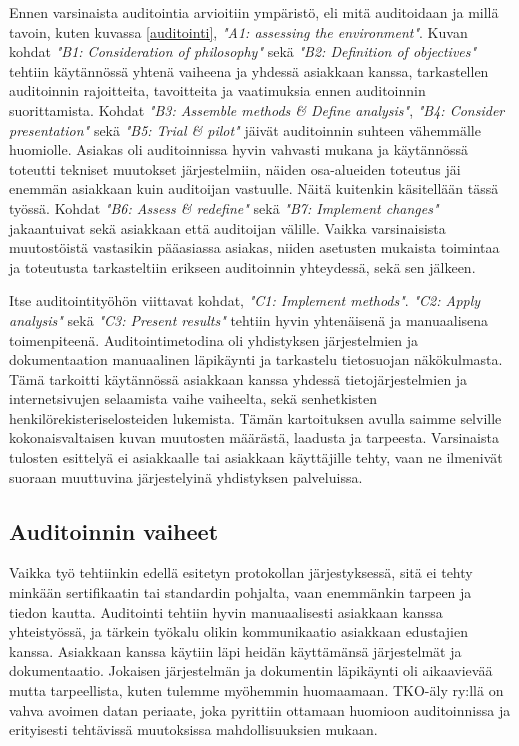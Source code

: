 \documentclass[finnish]{tktltiki}
\begin{document}
Ennen varsinaista auditointia arvioitiin ympäristö, eli mitä auditoidaan ja millä tavoin, kuten kuvassa \ref{auditointi}, \textit{"A1: assessing the environment"}. Kuvan kohdat \textit{"B1: Consideration of philosophy"} sekä \textit{"B2: Definition of objectives"} tehtiin käytännössä yhtenä vaiheena ja yhdessä asiakkaan kanssa, tarkastellen auditoinnin rajoitteita, tavoitteita ja vaatimuksia ennen auditoinnin suorittamista. Kohdat \textit{"B3: Assemble methods \& Define analysis"}, \textit{"B4: Consider presentation"} sekä \textit{"B5: Trial \& pilot"} jäivät auditoinnin suhteen vähemmälle huomiolle. Asiakas oli auditoinnissa hyvin vahvasti mukana ja käytännössä toteutti tekniset muutokset järjestelmiin, näiden osa-alueiden toteutus jäi enemmän asiakkaan kuin auditoijan vastuulle. Näitä kuitenkin käsitellään tässä työssä. Kohdat \textit{"B6: Assess \& redefine"} sekä \textit{"B7: Implement changes"} jakaantuivat sekä asiakkaan että auditoijan välille. Vaikka varsinaisista muutostöistä vastasikin pääasiassa asiakas, niiden asetusten mukaista toimintaa ja toteutusta tarkasteltiin erikseen auditoinnin yhteydessä, sekä sen jälkeen. 

Itse auditointityöhön viittavat kohdat, \textit{"C1: Implement methods"}. \textit{"C2: Apply analysis"} sekä \textit{"C3: Present results"} tehtiin hyvin yhtenäisenä ja manuaalisena toimenpiteenä. Auditointimetodina oli yhdistyksen järjestelmien ja dokumentaation manuaalinen läpikäynti ja tarkastelu tietosuojan näkökulmasta. Tämä tarkoitti käytännössä asiakkaan kanssa yhdessä tietojärjestelmien ja internetsivujen selaamista vaihe vaiheelta, sekä senhetkisten henkilörekisteriselosteiden lukemista. Tämän kartoituksen avulla saimme selville kokonaisvaltaisen kuvan muutosten määrästä, laadusta ja tarpeesta. Varsinaista tulosten esittelyä ei asiakkaalle tai asiakkaan käyttäjille tehty, vaan ne ilmenivät suoraan muuttuvina järjestelyinä yhdistyksen palveluissa.

\subsection{Auditoinnin vaiheet}

Vaikka työ tehtiinkin edellä esitetyn protokollan järjestyksessä, sitä ei tehty minkään sertifikaatin tai standardin pohjalta, vaan enemmänkin tarpeen ja tiedon kautta. Auditointi tehtiin hyvin manuaalisesti asiakkaan kanssa yhteistyössä,  ja tärkein työkalu olikin kommunikaatio asiakkaan edustajien kanssa. Asiakkaan kanssa käytiin läpi heidän käyttämänsä järjestelmät ja dokumentaatio. Jokaisen järjestelmän ja dokumentin läpikäynti oli aikaavievää mutta tarpeellista, kuten tulemme myöhemmin huomaamaan. TKO-äly ry:llä on vahva avoimen datan periaate, joka pyrittiin ottamaan huomioon auditoinnissa ja erityisesti tehtävissä muutoksissa mahdollisuuksien mukaan.
\end{document}
